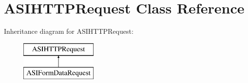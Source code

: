 \hypertarget{interface_a_s_i_h_t_t_p_request}{
\section{ASIHTTPRequest Class Reference}
\label{interface_a_s_i_h_t_t_p_request}
}
Inheritance diagram for ASIHTTPRequest:\begin{figure}[H]
\begin{center}
\leavevmode
\includegraphics[height=2.000000cm]{interface_a_s_i_h_t_t_p_request}
\end{center}
\end{figure}
